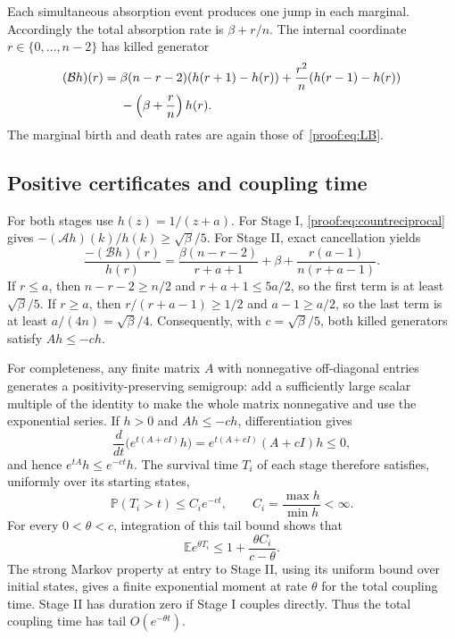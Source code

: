 Each simultaneous absorption event produces one jump in each
marginal. Accordingly the total absorption rate is $\beta+r/n$.
The internal coordinate $r\in\{0,\ldots,n-2\}$ has killed generator
\begin{align}
 (\mathcal Bh)(r)
 ={}&\beta(n-r-2)(h(r+1)-h(r))
     +\frac{r^2}{n}(h(r-1)-h(r))\notag\\
 &-\left(\beta+\frac rn\right)h(r).
 \label{proof:eq:stageII}
\end{align}
The marginal birth and death rates are again those
of~\eqref{proof:eq:LB}.

\subsection*{Positive certificates and coupling time}
For both stages use $h(z)=1/(z+a)$. For Stage I,
\eqref{proof:eq:countreciprocal} gives
$-(\mathcal Ah)(k)/h(k)\geq\sqrt\beta/5$. For Stage II, exact
cancellation yields
\begin{equation}\label{proof:eq:stageIIcertificate}
 \frac{-(\mathcal Bh)(r)}{h(r)}
 =\frac{\beta(n-r-2)}{r+a+1}+\beta
  +\frac{r(a-1)}{n(r+a-1)}.
\end{equation}
If $r\leq a$, then $n-r-2\geq n/2$ and $r+a+1\leq5a/2$, so
the first term is at least $\sqrt\beta/5$. If $r\geq a$, then
$r/(r+a-1)\geq1/2$ and $a-1\geq a/2$, so the last term is at
least $a/(4n)=\sqrt\beta/4$. Consequently, with
$c=\sqrt\beta/5$, both killed generators satisfy $Ah\leq-ch$.

For completeness, any finite matrix $A$ with nonnegative
off-diagonal entries generates a positivity-preserving semigroup:
add a sufficiently large scalar multiple of the identity to make
the whole matrix nonnegative and use the exponential series. If
$h>0$ and $Ah\leq-ch$, differentiation gives
\[
 \frac{d}{dt}\bigl(e^{t(A+cI)}h\bigr)
 =e^{t(A+cI)}(A+cI)h\leq0,
\]
and hence $e^{tA}h\leq e^{-ct}h$. The survival time $T_i$ of each
stage therefore satisfies, uniformly over its starting states,
\[
 \mathbb P(T_i>t)\leq C_i e^{-ct},
 \qquad
 C_i=\frac{\max h}{\min h}<\infty.
\]
For every $0<\theta<c$, integration of this tail bound shows that
\[
 \mathbb E e^{\theta T_i}
 \leq1+\frac{\theta C_i}{c-\theta}.
\]
The strong Markov property at entry to Stage II, using its uniform
bound over initial states, gives a finite exponential moment at
rate $\theta$ for the total coupling time. Stage II has duration
zero if Stage I couples directly. Thus the total coupling time has
tail $O(e^{-\theta t})$.

